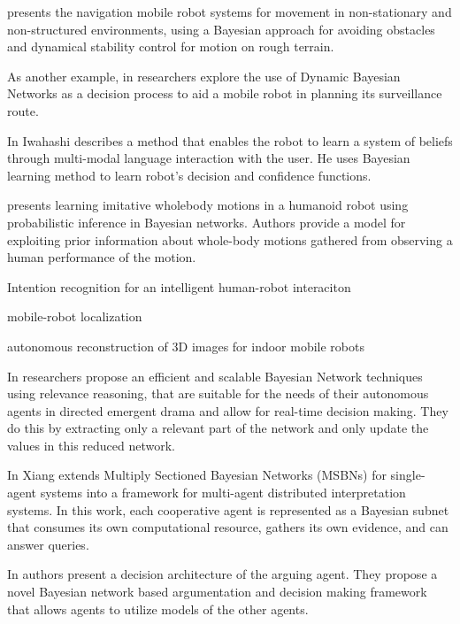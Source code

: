 \documentclass[11pt]{article}
\begin{document}
\cite{vladareanu:robot-naviation-bayesian} presents the navigation mobile robot
systems for movement in non-stationary and non-structured environments, using a
Bayesian approach for avoiding obstacles and dynamical stability control for
motion on rough terrain.

As another example, in \cite{chong:bbn-decision-planning} researchers explore
the use of Dynamic Bayesian Networks as a decision process to aid a mobile robot
in planning its surveillance route.

In \cite{iwahashi:belief-system-hri} Iwahashi describes a method that enables
the robot to learn a system of beliefs through multi-modal language interaction
with the user. He uses Bayesian learning method to learn robot's decision and
confidence functions.

\cite{grimes:imitation-robot-bayesian} presents learning imitative wholebody
motions in a humanoid robot using probabilistic inference in Bayesian networks.
Authors provide a model for exploiting prior information about whole-body
motions gathered from observing a human performance of the motion.

Intention recognition for an intelligent human-robot interaciton
\cite{tahboub:hri-dbn}

mobile-robot localization \cite{zhou:mobile-robot-localization}
\cite{fox:bayesian-location}

autonomous reconstruction of 3D images for indoor mobile robots
\cite{delage:dbn-image-reconstruction}




In \cite{arinbjarnar:bn-agent-drama} researchers propose an efficient and
scalable Bayesian Network techniques using relevance reasoning, that are
suitable for the needs of their autonomous agents in directed emergent drama and
allow for real-time decision making. They do this by extracting only a relevant
part of the network and only update the values in this reduced network.

In \cite{xiang:dai-bn} Xiang extends Multiply Sectioned Bayesian Networks
(MSBNs) for single-agent systems into a framework for multi-agent distributed
interpretation systems. In this work, each cooperative agent is represented as a
Bayesian subnet that consumes its own computational resource, gathers its own
evidence, and can answer queries.

In \cite{saha:bayes-negotiation} authors present a decision architecture of the
arguing agent. They propose a novel Bayesian network based argumentation and
decision making framework that allows agents to utilize models of the other
agents.
\end{document}
